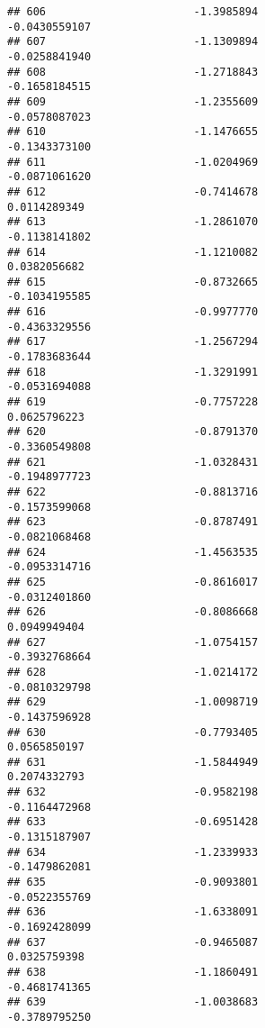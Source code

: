 \documentclass[
]{article}
\begin{document}
\begin{verbatim}
## 606                       -1.3985894                         -0.0430559107
## 607                       -1.1309894                         -0.0258841940
## 608                       -1.2718843                         -0.1658184515
## 609                       -1.2355609                         -0.0578087023
## 610                       -1.1476655                         -0.1343373100
## 611                       -1.0204969                         -0.0871061620
## 612                       -0.7414678                          0.0114289349
## 613                       -1.2861070                         -0.1138141802
## 614                       -1.1210082                          0.0382056682
## 615                       -0.8732665                         -0.1034195585
## 616                       -0.9977770                         -0.4363329556
## 617                       -1.2567294                         -0.1783683644
## 618                       -1.3291991                         -0.0531694088
## 619                       -0.7757228                          0.0625796223
## 620                       -0.8791370                         -0.3360549808
## 621                       -1.0328431                         -0.1948977723
## 622                       -0.8813716                         -0.1573599068
## 623                       -0.8787491                         -0.0821068468
## 624                       -1.4563535                         -0.0953314716
## 625                       -0.8616017                         -0.0312401860
## 626                       -0.8086668                          0.0949949404
## 627                       -1.0754157                         -0.3932768664
## 628                       -1.0214172                         -0.0810329798
## 629                       -1.0098719                         -0.1437596928
## 630                       -0.7793405                          0.0565850197
## 631                       -1.5844949                          0.2074332793
## 632                       -0.9582198                         -0.1164472968
## 633                       -0.6951428                         -0.1315187907
## 634                       -1.2339933                         -0.1479862081
## 635                       -0.9093801                         -0.0522355769
## 636                       -1.6338091                         -0.1692428099
## 637                       -0.9465087                          0.0325759398
## 638                       -1.1860491                         -0.4681741365
## 639                       -1.0038683                         -0.3789795250

\end{verbatim}
\end{document}
